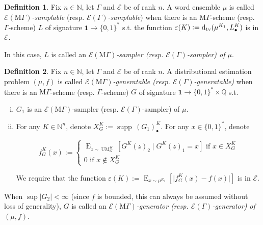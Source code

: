 \documentclass{article}
\numberwithin{equation}{section}
\theoremstyle{definition}
\newtheorem{definition}{Definition}[section]
\theoremstyle{plain}
\newcommand{\Bool}{\{0,1\}}
\newcommand{\Words}{{\Bool^*}}
\DeclareMathOperator{\Supp}{supp}
\DeclareMathOperator{\E}{E}
\DeclareMathOperator{\UM}{UM}
\newcommand{\Dtv}{\operatorname{d}_{\textnormal{tv}}}
\newcommand{\Nats}{\mathbb{N}}
\newcommand{\Rats}{\mathbb{Q}}
\newcommand{\Abs}[1]{\lvert #1 \rvert}
\newcommand{\MGrow}{\mathrm{M}\Gamma}
\newcommand{\Fall}{\mathcal{E}}
\begin{document}
\begin{samepage}
\begin{definition}

Fix $n \in \Nats$, let $\Gamma$ and $\Fall$ be of rank $n$. A word ensemble $\mu$ is called \emph{$\Fall(\MGrow)$-samplable} (resp. \emph{$\Fall(\Gamma)$-samplable}) when there is an $\MGrow$-scheme (resp. $\Gamma$-scheme) $L$ of signature $\bm{1} \rightarrow \Words$  s.t. the function $\varepsilon(K):=\Dtv(\mu^{K_1},L_\bullet^K)$ is in $\Fall$.

In this case, $L$ is called an \emph{$\Fall(\MGrow)$-sampler (resp. $\Fall(\Gamma)$-sampler) of $\mu$}.

\end{definition}
\end{samepage}

\begin{samepage}
\begin{definition}

Fix $n \in \Nats$, let $\Gamma$ and $\Fall$ be of rank $n$. A distributional estimation problem $(\mu,f)$ is called \emph{$\Fall(\MGrow)$-generatable (resp. $\Fall(\Gamma)$-generatable)} when there is an $\MGrow$-scheme (resp. $\Gamma$-scheme) $G$ of signature $\bm{1} \rightarrow \Words \times \Rats$ s.t. 

\begin{enumerate}[(i)]

\item $G_1$ is an $\Fall(\MGrow)$-sampler (resp. $\Fall(\Gamma)$-sampler) of $\mu$.

\item For any $K \in \Nats^n$, denote $X_{G}^K:=\Supp \, (G_1)_\bullet^K$. For any $x \in \Words$, denote 

$$f_G^K(x):=\begin{cases}\E_{z \sim\UM_G^K}[G^K(z)_2 \mid G^K(z)_1 = x] \text{ if } x \in X_{G}^K \\ 0 \text{ if } x \not\in X_{G}^K \end{cases}$$

We require that the function $\varepsilon(K):=\E_{x \sim \mu^{K_1}}[\Abs{f_G^K(x)-f(x)}]$ is in $\Fall$.

\end{enumerate}

When $\sup{\Abs{G_2}} < \infty$ (since $f$ is bounded, this can always be assumed without loss of generality), $G$ is called an \emph{$\Fall(\MGrow)$-generator (resp. $\Fall(\Gamma)$-generator) of $(\mu,f)$}.

\end{definition}
\end{samepage}
\end{document}
